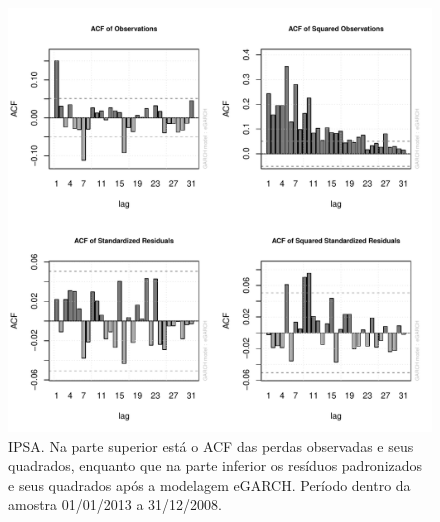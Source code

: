 \documentclass[1p]{elsarticle}
\theoremstyle{definition}
\begin{document}
\begin{figure}[H]
	\centering
	\includegraphics[width=1\linewidth]{figs/artigo-acf-IPSA}
	\caption{IPSA. Na parte superior está o ACF das perdas observadas e seus quadrados, enquanto que na parte inferior os resíduos padronizados e seus quadrados após a modelagem eGARCH. Período dentro da amostra 01/01/2013 a 31/12/2008.}
	\label{fig:artigo-acf-ipsa}
\end{figure}
\end{document}
